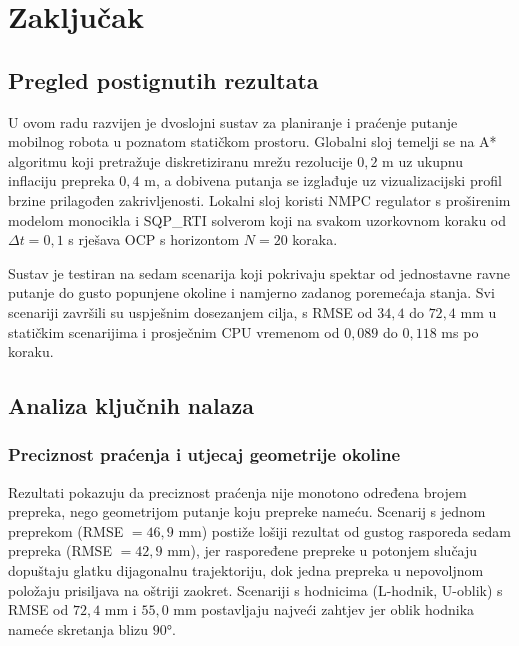 
\chapter{Zaključak}
\label{pog:zakljucak}

\section{Pregled postignutih rezultata}

U ovom radu razvijen je dvoslojni sustav za planiranje i praćenje putanje mobilnog robota u poznatom statičkom prostoru. Globalni sloj temelji se na A* algoritmu koji pretražuje diskretiziranu mrežu rezolucije $0{,}2$ m uz ukupnu inflaciju prepreka $0{,}4$ m, a dobivena putanja se izglađuje uz vizualizacijski profil brzine prilagođen zakrivljenosti. Lokalni sloj koristi NMPC regulator s proširenim modelom monocikla i SQP\_RTI solverom koji na svakom uzorkovnom koraku od $\Delta t = 0{,}1$ s rješava OCP s horizontom $N = 20$ koraka.

Sustav je testiran na sedam scenarija koji pokrivaju spektar od jednostavne ravne putanje do gusto popunjene okoline i namjerno zadanog poremećaja stanja. Svi scenariji završili su uspješnim dosezanjem cilja, s RMSE od $34{,}4$ do $72{,}4$ mm u statičkim scenarijima i prosječnim CPU vremenom od $0{,}089$ do $0{,}118$ ms po koraku.

\section{Analiza ključnih nalaza}

\subsection*{Preciznost praćenja i utjecaj geometrije okoline}

Rezultati pokazuju da preciznost praćenja nije monotono određena brojem prepreka, nego geometrijom putanje koju prepreke nameću. Scenarij s jednom preprekom (RMSE $= 46{,}9$ mm) postiže lošiji rezultat od gustog rasporeda sedam prepreka (RMSE $= 42{,}9$ mm), jer raspoređene prepreke u potonjem slučaju dopuštaju glatku dijagonalnu trajektoriju, dok jedna prepreka u nepovoljnom položaju prisiljava na oštriji zaokret. Scenariji s hodnicima (L-hodnik, U-oblik) s RMSE od $72{,}4$ mm i $55{,}0$ mm postavljaju najveći zahtjev jer oblik hodnika nameće skretanja blizu $90°$.

